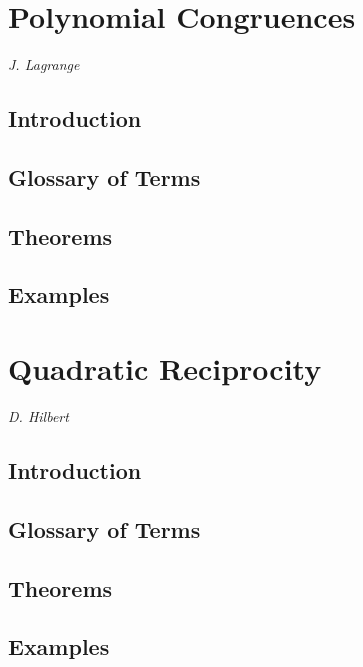 \documentclass[12pt]{article}
\begin{document}
\section{Polynomial Congruences} %

\setcounter{equation}{0}
\setcounter{theorem}{0}

\begin{center}
{\it J. Lagrange} %
\end{center}

\subsection{Introduction}

\subsection{Glossary of Terms}

\subsection{Theorems}

\subsection{Examples}


\section{Quadratic Reciprocity} %

\setcounter{equation}{0}
\setcounter{theorem}{0}

\begin{center}
{\it D. Hilbert} %
\end{center}

\subsection{Introduction}

\subsection{Glossary of Terms}

\subsection{Theorems}

\subsection{Examples}
\end{document}
